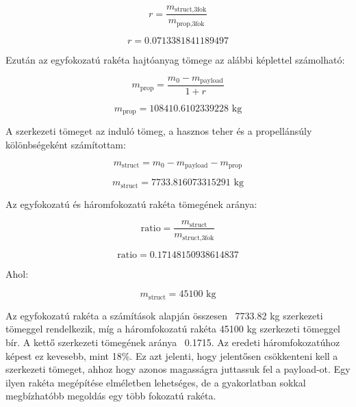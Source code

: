 \documentclass[a4paper,12pt]{article}
\begin{document}
\[
r = \frac{m_{\text{struct,3fok}}}{m_{\text{prop,3fok}}}
\]

\[
r = 0.0713381841189497
\]

Ezután az egyfokozatú rakéta hajtóanyag tömege az alábbi képlettel számolható:

\[
m_{\text{prop}} = \frac{m_0 - m_{\text{payload}}}{1 + r}
\]

\[
m_{\text{prop}} = 108410.6102339228 \text{ kg}
\]

A szerkezeti tömeget az induló tömeg, a hasznos teher és a propellánsúly kölönbségeként számítottam:

\[
m_{\text{struct}} = m_0 - m_{\text{payload}} - m_{\text{prop}}
\]

\[
m_{\text{struct}} = 7733.816073315291 \text{ kg}
\]

Az egyfokozatú és háromfokozatú rakéta tömegének aránya:

\[
\text{ratio} = \frac{m_{\text{struct}}}{m_{\text{struct,3fok}}}
\]

\[
\text{ratio} = 0.17148150938614837
\]

Ahol:

\[
m_{\text{struct}} = 45100 \text{ kg}
\]

Az egyfokozatú rakéta a számítások alapján összesen ~7733.82 kg szerkezeti tömeggel rendelkezik, míg a háromfokozatú rakéta 45100 kg szerkezeti tömeggel bír.
A kettő szerkezeti tömegének aránya ~0.1715. Az eredeti háromfokozatúhoz képest ez kevesebb, mint 18\%. Ez azt jelenti, hogy jelentősen csökkenteni kell a szerkezeti tömeget, ahhoz
hogy azonos magasságra juttassuk fel a payload-ot. Egy ilyen rakéta megépítése elméletben lehetséges, de a gyakorlatban sokkal megbízhatóbb megoldás egy több fokozatú rakéta.
\end{document}
